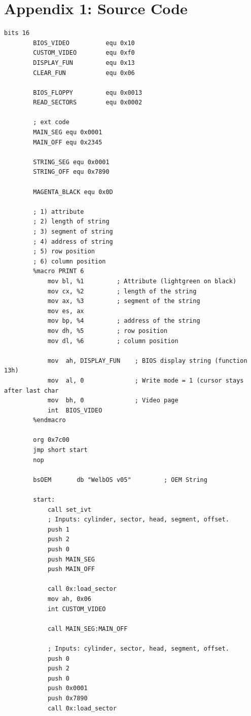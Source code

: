 \documentclass{article}
\begin{document}
    \section{Appendix 1: Source Code}\label{sec:appendix_1}
    \begin{lstlisting}[caption={os623V05.asm listing}, captionpos=t]
        bits 16
        BIOS_VIDEO          equ 0x10
        CUSTOM_VIDEO        equ 0xf0
        DISPLAY_FUN         equ 0x13
        CLEAR_FUN           equ 0x06

        BIOS_FLOPPY         equ 0x0013
        READ_SECTORS        equ 0x0002

        ; ext code
        MAIN_SEG equ 0x0001
        MAIN_OFF equ 0x2345

        STRING_SEG equ 0x0001
        STRING_OFF equ 0x7890

        MAGENTA_BLACK equ 0x0D

        ; 1) attribute
        ; 2) length of string
        ; 3) segment of string
        ; 4) address of string
        ; 5) row position
        ; 6) column position
        %macro PRINT 6
            mov bl, %1         ; Attribute (lightgreen on black)
            mov cx, %2         ; length of the string
            mov ax, %3         ; segment of the string
            mov es, ax
            mov bp, %4         ; address of the string
            mov dh, %5         ; row position
            mov dl, %6         ; column position

            mov  ah, DISPLAY_FUN    ; BIOS display string (function 13h)
            mov  al, 0              ; Write mode = 1 (cursor stays after last char
            mov  bh, 0              ; Video page
            int  BIOS_VIDEO
        %endmacro

        org 0x7c00
        jmp short start
        nop

        bsOEM       db "WelbOS v05"         ; OEM String

        start:
            call set_ivt
            ; Inputs: cylinder, sector, head, segment, offset.
            push 1
            push 2
            push 0
            push MAIN_SEG
            push MAIN_OFF

            call 0x:load_sector
            mov ah, 0x06
            int CUSTOM_VIDEO

            call MAIN_SEG:MAIN_OFF

            ; Inputs: cylinder, sector, head, segment, offset.
            push 0
            push 2
            push 0
            push 0x0001
            push 0x7890
            call 0x:load_sector


\end{lstlisting}
\end{document}
